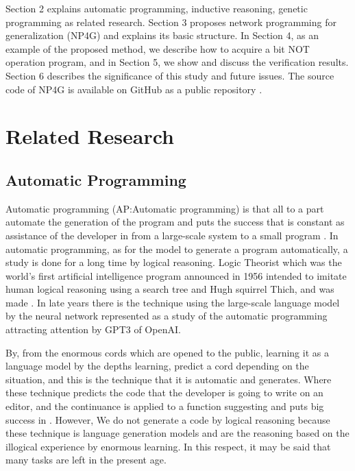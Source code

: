 \documentclass{article}
\begin{document}
Section 2 explains automatic programming, inductive reasoning, genetic programming as related research.
Section 3 proposes network programming for generalization (NP4G) and explains its basic structure.
In Section 4, as an example of the proposed method, we describe how to acquire a bit NOT operation program, and in Section 5, we show and discuss the verification results.
Section 6 describes the significance of this study and future issues.
The source code of NP4G is available on GitHub as a public repository \footnotemark[1]. 

\section{Related Research}
\subsection{Automatic Programming}
\label{sec:headings}
Automatic programming (AP:Automatic programming) is that all to a part automate the generation of the program and puts the success that is constant as assistance of the developer in from a large-scale system to a small program \cite{AutomaticProgramming}. 
In automatic programming, as for the model to generate a program automatically, a study is done for a long time by logical reasoning.
Logic Theorist which was the world's first artificial intelligence program announced in 1956 intended to imitate human logical reasoning using a search tree and Hugh squirrel Thich, and was made \cite{LogicTheorist}.
In late years there is the technique using the large-scale language model by the neural network represented as a study of the automatic programming attracting attention by GPT3\cite{gpt3} of OpenAI.

By, from the enormous cords which are opened to the public, learning it as a language model by the depths learning, predict a cord depending on the situation, and this is the technique that it is automatic and generates.
Where these technique predicts the code that the developer is going to write on an editor, and the continuance is applied to a function suggesting and puts big success in \cite{copilot}.
However, We do not generate a code by logical reasoning because these technique is language generation models and are the reasoning based on the illogical experience by enormous learning.
In this respect, it may be said that many tasks are left in the present age.
\end{document}
